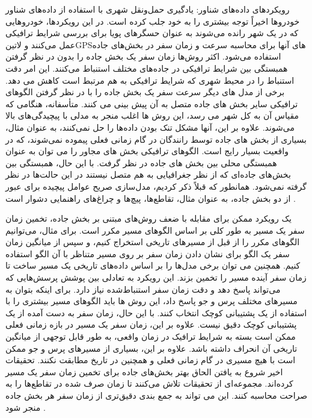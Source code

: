 رویکردهای داده‌های شناور: یادگیری حمل‌ونقل شهری با استفاده از داده‌های شناور خودروها اخیراً توجه بیشتری را به خود جلب کرده است. در این رویکردها، خودروهایی که در یک شهر رانده می‌شوند به عنوان حسگرهای پویا برای بررسی شرایط ترافیکی عمل می‌کنند و ‌لاتین{GPS}های آنها برای محاسبه سرعت و زمان سفر در بخش‌های جاده استفاده می‌شود. اکثر روش‌ها زمان سفر یک بخش جاده را بدون در نظر گرفتن همبستگی بین شرایط ترافیکی در جاده‌های مختلف استنباط می‌کنند. این امر دقت استنباط را در محیط شهری که شرایط ترافیکی به هم مرتبط است کاهش می دهد. برخی از مدل های دیگر سرعت سفر یک بخش جاده را با در نظر گرفتن الگوهای ترافیکی سایر بخش های جاده متصل به آن پیش بینی می کنند. متأسفانه، هنگامی که مقیاس آن به کل شهر می رسد، این روش ها اغلب منجر به مدلی با پیچیدگی‌های بالا می‌شوند. علاوه بر این، آنها مشکل تنک بودن داده‌ها را حل نمی‌کنند، به عنوان مثال، بسیاری از بخش های جاده توسط رانندگان در گام زمانی فعلی پیموده نمی‌شوند، که در واقعیت بسیار رایج است. الگوهای ترافیکی بخش های مجاور را می توان به عنوان همبستگی محلی بین بخش های جاده در نظر گرفت. با این حال، همبستگی بین بخش‌های جاده‌ای که از نظر جغرافیایی به هم متصل نیستند در این حالت‌ها در نظر گرفته نمی‌شود. همانطور که قبلاً ذکر کردیم، مدل‌سازی صریح عوامل پیچیده برای عبور از دو بخش جاده، به عنوان مثال، تقاطع‌ها، پیچ‌ها و چراغ‌های راهنمایی دشوار است
.

یک رویکرد ممکن برای مقابله با ضعف روش‌های مبتنی بر بخش جاده، تخمین زمان سفر یک مسیر به طور کلی بر اساس الگوهای مسیر مکرر است. برای مثال، می‌توانیم الگوهای مکرر را از قبل از مسیرهای تاریخی استخراج کنیم، و سپس از میانگین زمان سفر یک الگو برای نشان دادن زمان سفر بر روی مسیر متناظر با آن الگو استفاده کنیم. همچنین می توان برخی مدل‌ها را بر اساس داده‌های تاریخی یک مسیر ساخت تا زمان سفر آینده مسیر را تخمین بزند. این رویکرد به تعادلی بین پوشش پرسش‌هایی که می‌تواند پاسخ دهد و دقت زمان سفر استنباط‌شده نیاز دارد. برای اینکه بتوان به مسیرهای مختلف پرس و جو پاسخ داد، این روش ها باید الگوهای مسیر بیشتری را با استفاده از یک پشتیبانی  کوچک انتخاب کنند. با این حال، زمان سفر به دست آمده از یک پشتیبانی کوچک دقیق نیست. علاوه بر این، زمان سفر یک مسیر در بازه زمانی فعلی ممکن است بسته به شرایط ترافیک در زمان واقعی، به طور قابل توجهی از میانگین تاریخی آن انحراف داشته باشد. علاوه بر این، بسیاری از مسیرهای پرس و جو ممکن است با هیچ مسیری در گام زمانی فعلی و همچنین در تاریخ مطابقت نکنند. تحقیقات اخیر شروع به یافتن الحاق بهتر بخش‌های جاده برای تخمین زمان سفر یک مسیر کرده‌اند. مجموعه‌ای از تحقیقات تلاش می‌کنند تا زمان صرف شده در تقاطع‌ها را به صراحت محاسبه کنند. این می تواند به جمع بندی دقیق‌تری از زمان سفر هر بخش جاده منجر شود
.

